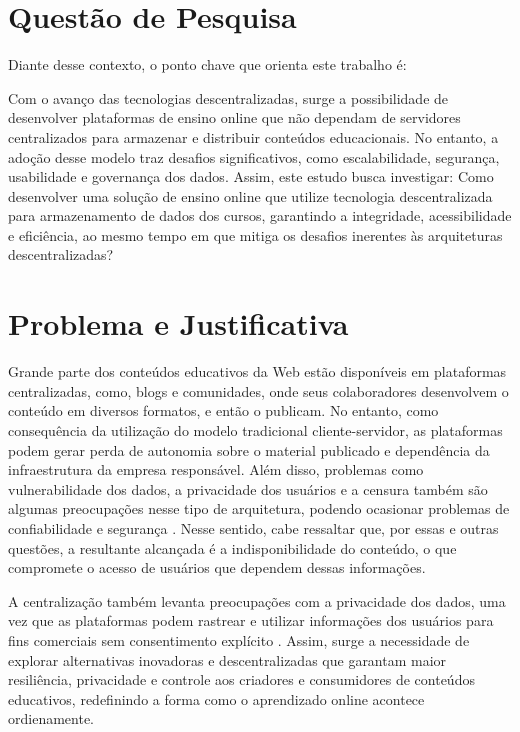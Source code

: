 \section{Questão de Pesquisa}
Diante desse contexto, o ponto chave que orienta este trabalho é:

Com o avanço das tecnologias descentralizadas, surge a possibilidade de desenvolver plataformas de ensino online que não dependam de servidores centralizados para armazenar e distribuir conteúdos educacionais. No entanto, a adoção desse modelo traz desafios significativos, como escalabilidade, segurança, usabilidade e governança dos dados. Assim, este estudo busca investigar: Como desenvolver uma solução de ensino online que utilize tecnologia descentralizada para armazenamento de dados dos cursos, garantindo a integridade, acessibilidade e eficiência, ao mesmo tempo em que mitiga os desafios inerentes às arquiteturas descentralizadas?

\section{Problema e Justificativa}

Grande parte dos conteúdos educativos da Web estão disponíveis em plataformas centralizadas, como, blogs e comunidades, onde seus colaboradores desenvolvem o conteúdo em diversos formatos, e então o publicam. No entanto, como consequência da utilização do modelo tradicional cliente-servidor, as plataformas podem gerar perda de autonomia sobre o material publicado e dependência da infraestrutura da empresa responsável. Além disso, problemas como vulnerabilidade dos dados, a privacidade dos usuários e a censura também são algumas preocupações nesse tipo de arquitetura, podendo ocasionar problemas de confiabilidade e segurança \cite{wanner2024}. Nesse sentido, cabe ressaltar que, por essas e outras questões, a resultante alcançada é a indisponibilidade do conteúdo, o que compromete o acesso de usuários que dependem dessas informações. 

A centralização também levanta preocupações com a privacidade dos dados, uma vez que as plataformas podem rastrear e utilizar informações dos usuários para fins comerciais sem consentimento explícito \cite{beiro2020}. Assim, surge a necessidade de explorar alternativas inovadoras e descentralizadas que garantam maior resiliência, privacidade e controle aos criadores e consumidores de conteúdos educativos, redefinindo a forma como o aprendizado online acontece ordienamente.

